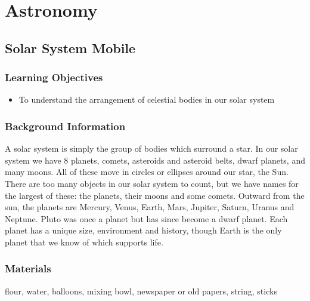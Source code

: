 \section{Astronomy}

\subsection{Solar System Mobile}

\subsubsection*{Learning Objectives}
\begin{itemize}
\item{To understand the arrangement of celestial bodies in our solar system}
\end{itemize}

\subsubsection*{Background Information}
A solar system is simply the group of bodies which surround a star.  In our solar system we have 8 planets, comets, asteroids and asteroid belts, dwarf planets, and many moons.  All of these move in circles or ellipses around our star, the Sun.  There are too many objects in our solar system to count, but we have names for the largest of these: the planets, their moons and some comets.  Outward from the sun, the planets are Mercury, Venus, Earth, Mars, Jupiter, Saturn, Uranus and Neptune.  Pluto was once a planet but has since become a dwarf planet.  Each planet has a unique size, environment and history, though Earth is the only planet that we know of which supports life.

\subsubsection*{Materials} flour, water, balloons, mixing bowl, newspaper or old papers, string, sticks

